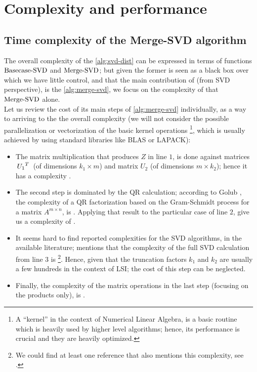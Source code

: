 \section{Complexity and performance}

\subsection{Time complexity of the Merge-SVD algorithm}
The overall complexity of the \cref{alg:svd-dist} can be expressed in
terms of functions $\operatorname{Basecase-SVD}$ and $\operatorname{Merge-SVD}$; but
given the former is seen as a black box over which we have little
control, and that the main contribution of \Rehurek (from SVD 
perspective), is the \cref{alg:merge-svd}, we focus on the complexity
of that $\operatorname{Merge-SVD}$ alone. \\

Let us review the cost of its main steps of
\cref{alg:merge-svd} individually, as a way to arriving to the the overall
complexity (we will not consider the possible parallelization or
vectorization of the basic kernel operations \footnote{A ``kernel'' in
the context of Numerical Linear Algebra, is a basic routine which is
heavily used by higher level algorithms; hence, its performance is
crucial and they are heavily optimized.}, which is usually
achieved by using standard libraries like BLAS or LAPACK): 

\begin{itemize}
  \item The matrix multiplication that produces $Z$ in line $1$, is
    done against matrices $\,{U_1}^{T}\,$ (of dimensions $k_1 \times m$)
    and matrix $U_2$ (of dimensions $m \times k_2$); hence it has a
      complexity . \\ 

  \item The second step is dominated by the QR calculation; according
    to Golub \cite{golub13}, the complexity of a QR factorization
    based on the Gram-Schmidt process for a matrix $A^{m \times n}$,
    is . Applying that result to the particular case of
    line $2$, give us a complexity of . \\

   \item It seems hard to
     find reported complexities for the SVD algorithms, in the
     available literature; \Rehurek mentions that the complexity of
     the full SVD calculation from line $3$ is
     \footnote{We could find at least one reference
       that also mentions this complexity, see
       \cite{plassman05}.}. Hence, given that the truncation factors  
     $k_1$ and $k_2$ are usually a few hundreds in the context of LSI;
     the cost of this step can be neglected. \\

   \item Finally, the complexity of the matrix operations in the last step 
     (focusing on the products only), is . 
\end{itemize}
\hfill

